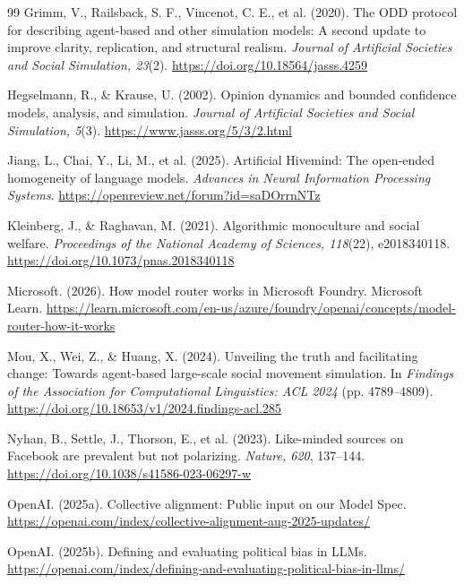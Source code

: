 \documentclass[11pt,a4paper]{article}
\begin{document}
\begin{thebibliography}{99}
Grimm, V., Railsback, S. F., Vincenot, C. E., et al. (2020). The ODD protocol for describing agent-based and other simulation models: A second update to improve clarity, replication, and structural realism. \textit{Journal of Artificial Societies and Social Simulation, 23}(2). \url{https://doi.org/10.18564/jasss.4259}

Hegselmann, R., \& Krause, U. (2002). Opinion dynamics and bounded confidence models, analysis, and simulation. \textit{Journal of Artificial Societies and Social Simulation, 5}(3). \url{https://www.jasss.org/5/3/2.html}

Jiang, L., Chai, Y., Li, M., et al. (2025). Artificial Hivemind: The open-ended homogeneity of language models. \textit{Advances in Neural Information Processing Systems}. \url{https://openreview.net/forum?id=saDOrrnNTz}

Kleinberg, J., \& Raghavan, M. (2021). Algorithmic monoculture and social welfare. \textit{Proceedings of the National Academy of Sciences, 118}(22), e2018340118. \url{https://doi.org/10.1073/pnas.2018340118}

Microsoft. (2026). How model router works in Microsoft Foundry. Microsoft Learn. \url{https://learn.microsoft.com/en-us/azure/foundry/openai/concepts/model-router-how-it-works}

Mou, X., Wei, Z., \& Huang, X. (2024). Unveiling the truth and facilitating change: Towards agent-based large-scale social movement simulation. In \textit{Findings of the Association for Computational Linguistics: ACL 2024} (pp. 4789--4809). \url{https://doi.org/10.18653/v1/2024.findings-acl.285}

Nyhan, B., Settle, J., Thorson, E., et al. (2023). Like-minded sources on Facebook are prevalent but not polarizing. \textit{Nature, 620}, 137--144. \url{https://doi.org/10.1038/s41586-023-06297-w}

OpenAI. (2025a). Collective alignment: Public input on our Model Spec. \url{https://openai.com/index/collective-alignment-aug-2025-updates/}

OpenAI. (2025b). Defining and evaluating political bias in LLMs. \url{https://openai.com/index/defining-and-evaluating-political-bias-in-llms/}


\end{thebibliography}
\end{document}
